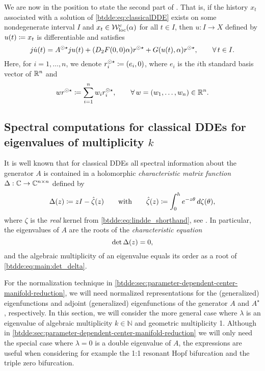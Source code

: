 We are now in the position to state the second part of \cite[Corollary
20]{Switching2019}. That is, if the history $x_t$ associated with a solution
of \cref{btdde:eq:classicalDDE} exists on some nondegenerate interval $I$ and $x_t \in
\mathcal{W}^c_{\text{loc}}(\alpha)$ for all $t \in I$, then $u : I \to X$ defined by $u(t) \coloneqq x_t$
is differentiable and satisfies
\[
  j\dot{u}(t) = A^{\odot\star}ju(t) + (D_2F(0,0)\alpha)r^{\odot\star} 
                    + G(u(t),\alpha)r^{\odot\star}, \qquad \forall\,t \in I.
\]
Here, for $i = 1,\ldots,n$, we denote $r^{\odot\star}_i \coloneqq (e_i, 0)$, where $e_i$ is the
$i$th standard basis vector of $\mathbb{R}^n$ and
\[
  w r^{\odot\star} \coloneqq \sum_{i=1}^n{w_ir^{\odot\star}_i}, \qquad 
    \forall\,w = (w_1,\ldots,w_n) \in \mathbb{R}^n.
\]

\subsection{Spectral computations for classical DDEs for eigenvalues of multiplicity \texorpdfstring{$k$}{k}}
It is well known that for classical DDEs all spectral information about the
generator $A$ is contained in a holomorphic \emph{characteristic matrix
function} $\Delta : \mathbb{C}
\to \mathbb{C}^{n \times n}$ defined by
\begin{equation}
\label{btdde:eq:CharMatrix}
  \Delta(z) \coloneqq zI - \hat{\zeta}(z) 
  \qquad \text{with} 
  \qquad \hat{\zeta}(z) \coloneqq \int_0^h{e^{-z\theta}\,d\zeta(\theta)},
\end{equation}
where $\zeta$ is the \emph{real} kernel from \cref{btdde:eq:lindde_shorthand}, see
\cite[Sections IV.4 and IV.5]{diekmann1995delay}. In particular, the
eigenvalues of $A$ are the roots of the \emph{characteristic equation}
\begin{equation}
  \label{btdde:eq:main:det_delta}
\operatorname{det}{\Delta(z)} = 0,
\end{equation}
and the algebraic multiplicity of an eigenvalue equals its order as a root of
\cref{btdde:eq:main:det_delta}.

For the normalization technique in \cref{btdde:sec:parameter-dependent-center-manifold-reduction},
we will need normalized representations for the (generalized) eigenfunctions and adjoint
(generalized) eigenfunctions of the generator $A$ and $A^\star$, respectively.
In this section, we will consider the more general case where $\lambda$ is an eigenvalue of
algebraic multiplicity $k \in \mathbb N$ and geometric multiplicity 1.  
Although in \cref{btdde:sec:parameter-dependent-center-manifold-reduction} we will
only need the special case where $\lambda=0$ is a double eigenvalue of $A$, the
expressions are useful when considering for example the 1:1 resonant Hopf
bifurcation and the triple zero bifurcation.

